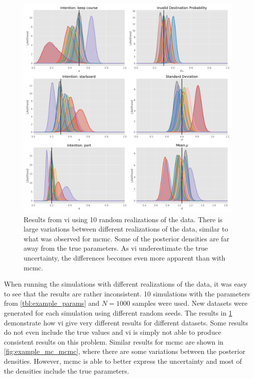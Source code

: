 \begin{figure}[h]
    \centering
    \includegraphics[width=\textwidth]{figures/mc_sim_vi.png}
    \caption{Results from \acrshort{vi} using 10 random realizations of the data. There is large variations between different realizations of the data, similar to what was observed for \acrshort{mcmc}. Some of the posterior densities are far away from the true parameters. As \acrshort{vi} underestimate the true uncertainty, the differences becomes even more apparent than with \acrshort{mcmc}. }
    \label{fig:example_mc_vi}
\end{figure}

When running the simulations with different realizations of the data, it was easy to see that the results are rather inconsistent. 10 simulations with the parameters from \cref{tbl:example_params} and $N=1000$ samples were used. New datasets were generated for each simulation using different random seeds. The results in \cref{fig:example_mc_vi} demonstrate how \acrshort{vi} give very different results for different datasets. Some results do not even include the true values and \acrshort{vi} is simply not able to produce consistent results on this problem. 
Similar results for \acrshort{mcmc} are shown in \cref{fig:example_mc_mcmc}, where there are some variations between the posterior densities. However, \acrshort{mcmc} is able to better express the uncertainty and most of the densities include the true parameters.


